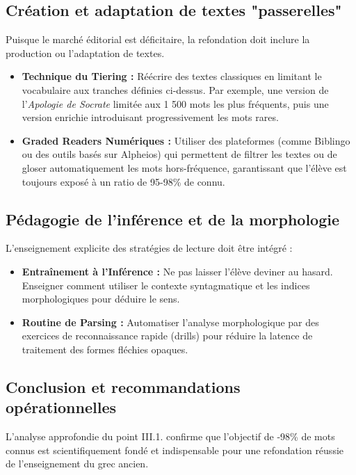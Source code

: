 {{\subsection{Création et adaptation de textes "passerelles"}

Puisque le marché éditorial est déficitaire, la refondation doit inclure la production ou
l'adaptation de textes.

\begin{itemize}\item \textbf{Technique du \og Tiering\fg{} :} Réécrire des textes classiques en limitant le vocabulaire aux tranches définies ci-dessus. Par exemple, une version de l'\textit{Apologie de Socrate} limitée aux 1 500 mots les plus fréquents, puis une version \og enrichie\fg{} introduisant progressivement les mots rares.\item \textbf{Graded Readers Numériques :} Utiliser des plateformes (comme Biblingo ou des outils basés sur Alpheios) qui permettent de filtrer les textes ou de gloser automatiquement les mots hors-fréquence, garantissant que l'élève est toujours exposé à un ratio de 95-98\% de connu.\cite{III-1-2-ref52}\end{itemize}

\subsection{Pédagogie de l'inférence et de la morphologie}

L'enseignement explicite des stratégies de lecture doit être intégré :

\begin{itemize}\item \textbf{Entraînement à l'Inférence :} Ne pas laisser l'élève deviner au hasard. Enseigner comment utiliser le contexte syntagmatique et les indices morphologiques pour déduire le sens.\cite{III-1-2-ref54}\item \textbf{Routine de Parsing :} Automatiser l'analyse morphologique par des exercices de reconnaissance rapide (drills) pour réduire la latence de traitement des formes fléchies opaques.\cite{III-1-2-ref53}\end{itemize}

\subsection{Conclusion et recommandations opérationnelles}

L'analyse approfondie du point III.1.\cite{III-1-2-ref2} confirme que l'objectif de -98\% de
mots connus\fg{} est scientifiquement fondé et indispensable pour une refondation réussie de
l'enseignement du grec ancien.

}}
